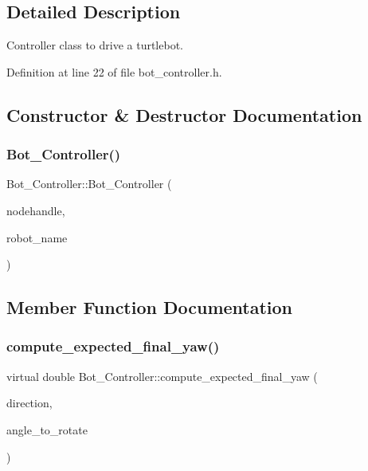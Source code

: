 \subsection{Detailed Description}
Controller class to drive a turtlebot. 

Definition at line 22 of file bot\+\_\+controller.\+h.



\subsection{Constructor \& Destructor Documentation}
\mbox{\label{class_bot___controller_a05104e1b41f7c9cd9cdfe80bbbd53a7d}} 
\subsubsection{\texorpdfstring{Bot\+\_\+\+Controller()}{Bot\_Controller()}}
{\footnotesize\ttfamily Bot\+\_\+\+Controller\+::\+Bot\+\_\+\+Controller (\begin{DoxyParamCaption}\item[{ros\+::\+Node\+Handle $\ast$}]{nodehandle,  }\item[{const std\+::string \&}]{robot\+\_\+name }\end{DoxyParamCaption})}



\subsection{Member Function Documentation}
\mbox{\label{class_bot___controller_abd0ba787692f53c17fed466e8850e1bc}} 
\subsubsection{\texorpdfstring{compute\+\_\+expected\+\_\+final\+\_\+yaw()}{compute\_expected\_final\_yaw()}}
{\footnotesize\ttfamily virtual double Bot\+\_\+\+Controller\+::compute\+\_\+expected\+\_\+final\+\_\+yaw (\begin{DoxyParamCaption}\item[{bool}]{direction,  }\item[{double}]{angle\+\_\+to\+\_\+rotate }\end{DoxyParamCaption})\hspace{0.3cm}{\ttfamily [pure virtual]}}


